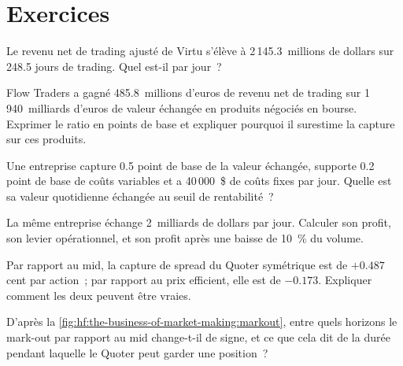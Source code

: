 \section{Exercices}

\begin{exercise}[$\star$]\label{exo:hf:the-business-of-market-making:1}
Le revenu net de trading ajusté de Virtu s'élève à 2\,145.3~millions de dollars sur 248.5 jours de trading. Quel est-il par jour~?
\end{exercise}

\begin{exercise}[$\star$]\label{exo:hf:the-business-of-market-making:2}
Flow Traders a gagné 485.8~millions d'euros de revenu net de trading sur 1\,940~milliards d'euros de valeur échangée en produits négociés en bourse. Exprimer le ratio en
points de base et expliquer pourquoi il surestime la capture sur ces produits.
\end{exercise}

\begin{exercise}[$\star$]\label{exo:hf:the-business-of-market-making:3}
Une entreprise capture 0.5 point de base de la valeur échangée, supporte 0.2 point de base de coûts variables et a 40\,000~\$ de coûts fixes par jour. Quelle est
sa valeur quotidienne échangée au seuil de rentabilité~?
\end{exercise}

\begin{exercise}[$\star\star$]\label{exo:hf:the-business-of-market-making:4}
La même entreprise échange 2~milliards de dollars par jour. Calculer son profit, son levier opérationnel, et son profit après une baisse de 10~\% du volume.
\end{exercise}

\begin{exercise}[$\star\star$]\label{exo:hf:the-business-of-market-making:5}
Par rapport au mid, la capture de spread du Quoter symétrique est de $+0.487$ cent par action~; par rapport au prix efficient, elle est de $-0.173$. Expliquer comment
les deux peuvent être vraies.
\end{exercise}

\begin{exercise}[$\star\star$]\label{exo:hf:the-business-of-market-making:6}
D'après la \cref{fig:hf:the-business-of-market-making:markout}, entre quels horizons le mark-out par rapport au mid change-t-il de signe, et ce que cela
dit de la durée pendant laquelle le Quoter peut garder une position~?
\end{exercise}

